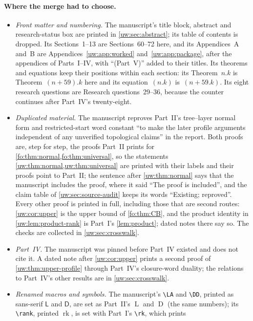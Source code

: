 \documentclass[11pt,letterpaper]{article}
\numberwithin{equation}{section}
\theoremstyle{definition}
\theoremstyle{remark}
\theoremstyle{definition}
\newcommand{\rk}{\operatorname{rk}}
\newcommand{\depth}{\operatorname{D}}
\newcommand{\layers}{\operatorname{L}}
\begin{document}
\paragraph{Where the merge had to choose.}
\begin{itemize}
\item \emph{Front matter and numbering.} The manuscript's title block,
abstract and research-status box are printed in \cref{uw:sec:abstract}; its
table of contents is dropped. Its Sections~1--13 are Sections~60--72 here,
and its Appendices~A and~B are Appendices~\ref{uw:app:worked}
and~\ref{uw:app:package}, after the appendices of Parts~I--IV, with
``(Part~V)'' added to their titles. Its theorems and equations keep their
positions within each section: its Theorem~$n.k$ is Theorem~$(n+59).k$ here
and its equation~$(n.k)$ is~$(n+59.k)$. Its eight research questions
are Research questions~29--36, because the counter continues after
Part~IV's twenty-eight.
\item \emph{Duplicated material.} The manuscript reproves Part~II's
tree--layer normal form and restricted-start word constant ``to make the
later profile arguments independent of any unverified topological claims''
in the report. Both proofs are, step for step, the proofs Part~II prints for
\cref{fo:thm:normal,fo:thm:universal}, so the statements
\cref{uw:thm:normal,uw:thm:universal} are printed with their labels and their
proofs point to Part~II; the sentence after \cref{uw:thm:normal} says that
the manuscript includes the proof, where it said ``The proof is included'',
and the claim table of \cref{uw:sec:source-audit} keeps its words
``Existing; reproved''. Every other proof is printed in full, including
those that are second routes: \cref{uw:cor:upper} is the upper bound of
\cref{fo:thm:CB}, and the product identity in \cref{uw:lem:product-rank} is
Part~I's \cref{lem:product}; dated notes there say so. The checks are
collected in \cref{uw:sec:crosswalk}.
\item \emph{Part~IV.} The manuscript was pinned before Part~IV existed and
does not cite it. A dated note after \cref{uw:cor:upper} prints a second
proof of \cref{uw:thm:upper-profile} through Part~IV's closure-word duality;
the relations to Part~IV's other results are in \cref{uw:sec:crosswalk}.
\item \emph{Renamed macros and symbols.} The manuscript's \verb|\LA| and
\verb|\DD|, printed as sans-serif $\mathsf L$ and $\mathsf D$, are set as
Part~II's $\layers$ and $\depth$ (the same numbers); its \verb|\rank|,
printed $\operatorname{rk}$, is set with Part~I's \verb|\rk|, which prints

\end{itemize}
\end{document}
